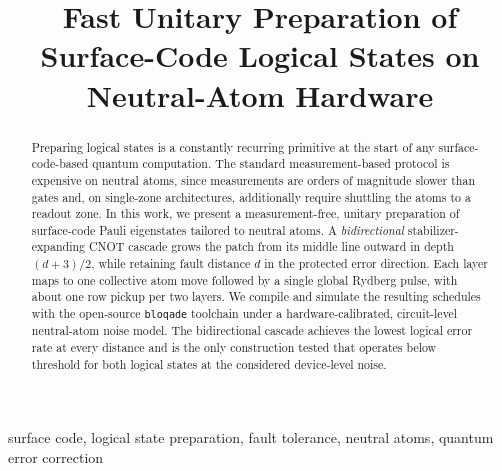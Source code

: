 \documentclass[conference]{IEEEtran}
\begin{document}
\title{Fast Unitary Preparation of Surface-Code Logical States on Neutral-Atom Hardware}

\author{%
%
\vspace{-12pt}%
}

\maketitle

\begin{abstract}
Preparing logical states is a constantly recurring primitive at the start of
any surface-code-based quantum computation. The standard measurement-based
protocol is expensive on neutral atoms, since measurements are orders of
magnitude slower than gates and, on single-zone architectures, additionally
require shuttling the atoms to a readout zone. In this work, we
present a measurement-free, unitary preparation of surface-code Pauli eigenstates
tailored to neutral atoms. A \emph{bidirectional} stabilizer-expanding
CNOT cascade grows the patch from its middle line outward in depth
$(d{+}3)/2$, while retaining fault distance $d$ in the protected error
direction. Each layer maps to one collective atom move
followed by a single global Rydberg pulse, with about one row pickup per two
layers. We compile and simulate the resulting schedules with the open-source
\texttt{bloqade} toolchain under a hardware-calibrated, circuit-level
neutral-atom noise model. The bidirectional cascade achieves the lowest
logical error rate at every distance and is the only construction tested that
operates below threshold for both logical states at the considered
device-level noise.
\end{abstract}

\begin{IEEEkeywords}
surface code, logical state preparation, fault tolerance, neutral atoms,
quantum error correction
\end{IEEEkeywords}
\end{document}
